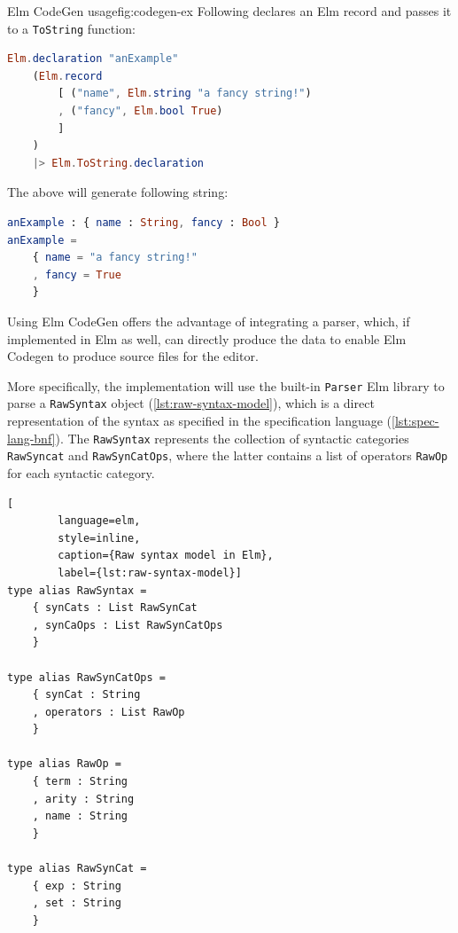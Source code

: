 \begin{myfigure}{Elm CodeGen usage}{fig:codegen-ex}
  Following declares an Elm record and passes it to a \texttt{ToString} function:

  \begin{lstlisting}[backgroundcolor=\color{myfigurecolorback},language=elm]
Elm.declaration "anExample"
    (Elm.record
        [ ("name", Elm.string "a fancy string!")
        , ("fancy", Elm.bool True)
        ]
    )
    |> Elm.ToString.declaration
\end{lstlisting}

  The above will generate following string:
  \begin{lstlisting}[backgroundcolor=\color{myfigurecolorback},language=elm]
anExample : { name : String, fancy : Bool }
anExample =
    { name = "a fancy string!"
    , fancy = True
    }
\end{lstlisting}
\end{myfigure}

Using Elm CodeGen offers the advantage of integrating a parser, which,
if implemented in Elm as well, can directly produce the data to enable
Elm Codegen to produce source files for the editor.

More specifically, the implementation will use the built-in \texttt{Parser} Elm
library to parse a \texttt{RawSyntax} object (\cref{lst:raw-syntax-model}),
which is a direct representation of the syntax as specified in the specification
language (\cref{lst:spec-lang-bnf}). The \texttt{RawSyntax} represents
the collection of syntactic categories \texttt{RawSyncat} and
\texttt{RawSynCatOps}, where the latter contains a list of operators
\texttt{RawOp} for each syntactic category.

\begin{minipage}{\textwidth}
  \begin{lstlisting}[
        language=elm,
        style=inline,
        caption={Raw syntax model in Elm},
        label={lst:raw-syntax-model}]
type alias RawSyntax =
    { synCats : List RawSynCat
    , synCaOps : List RawSynCatOps
    }

type alias RawSynCatOps =
    { synCat : String
    , operators : List RawOp
    }

type alias RawOp =
    { term : String
    , arity : String
    , name : String
    }

type alias RawSynCat =
    { exp : String
    , set : String
    }
\end{lstlisting}
\end{minipage}

